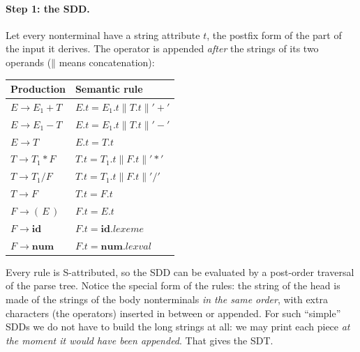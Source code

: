 \documentclass[11pt,a4paper]{article}
\newcommand{\cc}{\mathbin{\|}}
\newcommand{\at}[2]{\ensuremath{#1.\mathit{#2}}}
\newcommand{\tok}[1]{\ensuremath{\mathtt{#1}}}
\begin{document}
\paragraph{Step 1: the SDD.} Let every nonterminal have a string attribute $t$, the postfix form of the part of the input it derives. The operator is appended \emph{after} the strings of its two operands ($\cc$ means concatenation):
\begin{center}
\small
\begin{tabular}{@{}l l@{}}
\toprule
\textbf{Production} & \textbf{Semantic rule} \\ \midrule
$E \to E_1 + T$ & $\at{E}{t} = \at{E_1}{t}\cc\at{T}{t}\cc\tok{'+'}$ \\
$E \to E_1 - T$ & $\at{E}{t} = \at{E_1}{t}\cc\at{T}{t}\cc\tok{'-'}$ \\
$E \to T$       & $\at{E}{t} = \at{T}{t}$ \\
$T \to T_1 * F$ & $\at{T}{t} = \at{T_1}{t}\cc\at{F}{t}\cc\tok{'*'}$ \\
$T \to T_1 / F$ & $\at{T}{t} = \at{T_1}{t}\cc\at{F}{t}\cc\tok{'/'}$ \\
$T \to F$       & $\at{T}{t} = \at{F}{t}$ \\
$F \to (\,E\,)$ & $\at{F}{t} = \at{E}{t}$ \\
$F \to \mathbf{id}$  & $\at{F}{t} = \at{\mathbf{id}}{lexeme}$ \\
$F \to \mathbf{num}$ & $\at{F}{t} = \at{\mathbf{num}}{lexval}$ \\ \bottomrule
\end{tabular}
\end{center}
Every rule is S-attributed, so the SDD can be evaluated by a post-order traversal of the parse tree. Notice the special form of the rules: the string of the head is made of the strings of the body nonterminals \emph{in the same order}, with extra characters (the operators) inserted in between or appended. For such ``simple'' SDDs we do not have to build the long strings at all: we may print each piece \emph{at the moment it would have been appended}. That gives the SDT.
\end{document}
